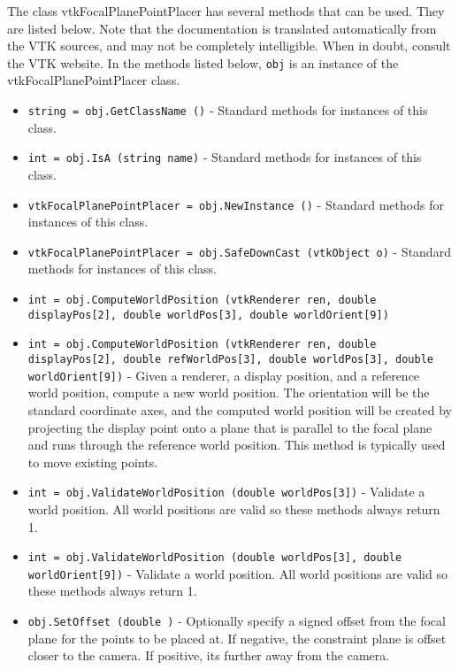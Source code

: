 The class vtkFocalPlanePointPlacer has several methods that can be used.
  They are listed below.
Note that the documentation is translated automatically from the VTK sources,
and may not be completely intelligible.  When in doubt, consult the VTK website.
In the methods listed below, \verb|obj| is an instance of the vtkFocalPlanePointPlacer class.
\begin{itemize}
\item  \verb|string = obj.GetClassName ()| -  Standard methods for instances of this class.

\item  \verb|int = obj.IsA (string name)| -  Standard methods for instances of this class.

\item  \verb|vtkFocalPlanePointPlacer = obj.NewInstance ()| -  Standard methods for instances of this class.

\item  \verb|vtkFocalPlanePointPlacer = obj.SafeDownCast (vtkObject o)| -  Standard methods for instances of this class.

\item  \verb|int = obj.ComputeWorldPosition (vtkRenderer ren, double displayPos[2], double worldPos[3], double worldOrient[9])|

\item  \verb|int = obj.ComputeWorldPosition (vtkRenderer ren, double displayPos[2], double refWorldPos[3], double worldPos[3], double worldOrient[9])| -  Given a renderer, a display position, and a reference
 world position, compute a new world position. The
 orientation will be the standard coordinate axes, and the
 computed world position will be created by projecting
 the display point onto a plane that is parallel to
 the focal plane and runs through the reference world
 position. This method is typically used to move existing
 points.

\item  \verb|int = obj.ValidateWorldPosition (double worldPos[3])| -  Validate a world position. All world positions
 are valid so these methods always return 1.

\item  \verb|int = obj.ValidateWorldPosition (double worldPos[3], double worldOrient[9])| -  Validate a world position. All world positions
 are valid so these methods always return 1.

\item  \verb|obj.SetOffset (double )| -  Optionally specify a signed offset from the focal plane for the points to
 be placed at.  If negative, the constraint plane is offset closer to the 
 camera. If positive, its further away from the camera.


\end{itemize}
